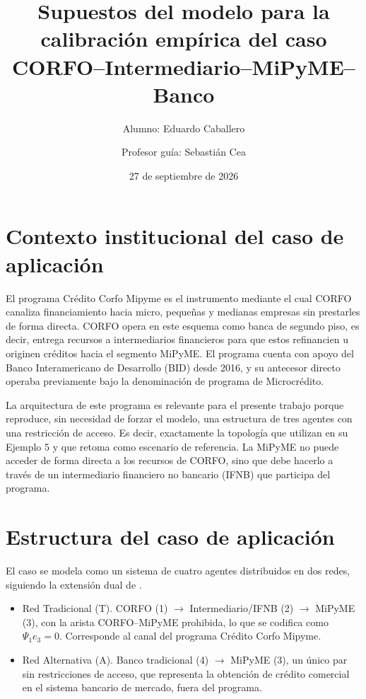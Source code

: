 \documentclass[11pt]{article}
\title{Supuestos del modelo para la calibración empírica del caso CORFO--Intermediario--MiPyME--Banco}
\author{Alumno: Eduardo Caballero \and Profesor guía: Sebastián Cea}
\date{27 de septiembre de 2026}
\begin{document}
\maketitle

\section{Contexto institucional del caso de aplicación}

El programa Crédito Corfo Mipyme es el instrumento mediante el cual CORFO canaliza financiamiento hacia micro, pequeñas y medianas empresas sin prestarles de forma directa. CORFO opera en este esquema como banca de segundo piso, es decir, entrega recursos a intermediarios financieros para que estos refinancien u originen créditos hacia el segmento MiPyME. El programa cuenta con apoyo del Banco Interamericano de Desarrollo (BID) desde 2016, y su antecesor directo operaba previamente bajo la denominación de programa de Microcrédito.

La arquitectura de este programa es relevante para el presente trabajo porque reproduce, sin necesidad de forzar el modelo, una estructura de tres agentes con una restricción de acceso. Es decir, exactamente la topología que \citet{jalan2024} utilizan en su Ejemplo 5 y que \citet{venegas2024} retoma como escenario de referencia. La MiPyME no puede acceder de forma directa a los recursos de CORFO, sino que debe hacerlo a través de un intermediario financiero no bancario (IFNB) que participa del programa.

\section{Estructura del caso de aplicación}
\label{sec:estructura}

El caso se modela como un sistema de cuatro agentes distribuidos en dos redes, siguiendo la extensión dual de \citet{venegas2024}.

\begin{itemize}
    \item Red Tradicional (T). CORFO (1) $\to$ Intermediario/IFNB (2) $\to$ MiPyME (3), con la arista CORFO--MiPyME prohibida, lo que se codifica como $\Psi_1 e_3 = 0$. Corresponde al canal del programa Crédito Corfo Mipyme.
    \item Red Alternativa (A). Banco tradicional (4) $\to$ MiPyME (3), un único par sin restricciones de acceso, que representa la obtención de crédito comercial en el sistema bancario de mercado, fuera del programa.
\end{itemize}
\end{document}
